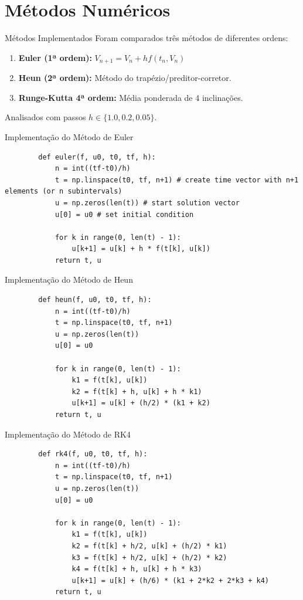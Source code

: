\documentclass{beamer}
\begin{document}
\section{Métodos Numéricos}

\begin{frame}{Métodos Implementados \cite{reamat,burden}}
    Foram comparados três métodos de diferentes ordens:
    \begin{enumerate}
        \item \textbf{Euler (1ª ordem):} $V_{n+1} = V_n + h f(t_n, V_n)$
        \item \textbf{Heun (2ª ordem):} Método do trapézio/preditor-corretor.
        \item \textbf{Runge-Kutta 4ª ordem:} Média ponderada de 4 inclinações.
    \end{enumerate}
    \vspace{0.3cm}
    Analisados com passos $h \in \{1.0, 0.2, 0.05\}$.
\end{frame}

\begin{frame}[fragile]{Implementação do Método de Euler}
    \begin{lstlisting}
        def euler(f, u0, t0, tf, h):
            n = int((tf-t0)/h)
            t = np.linspace(t0, tf, n+1) # create time vector with n+1 elements (or n subintervals)
            u = np.zeros(len(t)) # start solution vector
            u[0] = u0 # set initial condition

            for k in range(0, len(t) - 1):
                u[k+1] = u[k] + h * f(t[k], u[k])
            return t, u
    \end{lstlisting}
\end{frame}

\begin{frame}[fragile]{Implementação do Método de Heun}
    \begin{lstlisting}
        def heun(f, u0, t0, tf, h):
            n = int((tf-t0)/h)
            t = np.linspace(t0, tf, n+1)
            u = np.zeros(len(t))
            u[0] = u0

            for k in range(0, len(t) - 1):
                k1 = f(t[k], u[k])
                k2 = f(t[k] + h, u[k] + h * k1)
                u[k+1] = u[k] + (h/2) * (k1 + k2)
            return t, u
    \end{lstlisting}
\end{frame}

\begin{frame}[fragile]{Implementação do Método de RK4}
    \begin{lstlisting}
        def rk4(f, u0, t0, tf, h):
            n = int((tf-t0)/h)
            t = np.linspace(t0, tf, n+1)
            u = np.zeros(len(t))
            u[0] = u0

            for k in range(0, len(t) - 1):
                k1 = f(t[k], u[k])
                k2 = f(t[k] + h/2, u[k] + (h/2) * k1)
                k3 = f(t[k] + h/2, u[k] + (h/2) * k2)
                k4 = f(t[k] + h, u[k] + h * k3)
                u[k+1] = u[k] + (h/6) * (k1 + 2*k2 + 2*k3 + k4)
            return t, u
    \end{lstlisting}
\end{frame}
\end{document}
